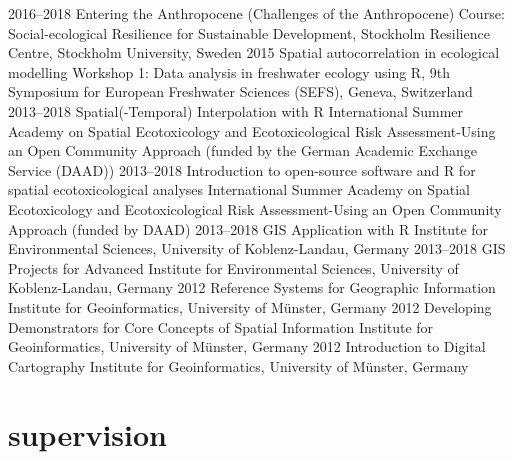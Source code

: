 \documentclass[]{friggeri-cv} %
\begin{document}
\begin{entrylist}
\entry
{\small{2016--2018}}
{Entering the Anthropocene (Challenges of the Anthropocene)}
{}
{Course: Social-ecological Resilience for Sustainable Development, Stockholm Resilience Centre, Stockholm University, Sweden}
\entry
{\small{2015}}
{Spatial autocorrelation in ecological modelling}
{}
{Workshop 1: Data analysis in freshwater ecology using R, 9th Symposium for European Freshwater Sciences (SEFS), Geneva, Switzerland}
\entry
{\small{2013--2018}}
{Spatial(-Temporal) Interpolation with R}
{}
{International Summer Academy on Spatial Ecotoxicology and Ecotoxicological Risk Assessment-Using an Open Community Approach (funded by the German Academic Exchange Service (DAAD))}
\entry
{\small{2013--2018}}
{Introduction to open-source software and R for spatial ecotoxicological analyses}
{}
{International Summer Academy on Spatial Ecotoxicology and Ecotoxicological Risk Assessment-Using an Open Community Approach (funded by DAAD)}
\entry
{\small{2013--2018}}
{GIS Application with R}
{}
{Institute for Environmental Sciences, University of Koblenz-Landau, Germany}
\entry
{\small{2013--2018}}
{GIS Projects for Advanced}
{}
{Institute for Environmental Sciences, University of Koblenz-Landau, Germany}
\entry
{\small{2012}}
{Reference Systems for Geographic Information}
{}
{Institute for Geoinformatics, University of M\"unster, Germany}
\entry
{\small{2012}}
{Developing Demonstrators for Core Concepts of Spatial Information}
{}
{Institute for Geoinformatics, University of M\"unster, Germany}
\entry
{\small{2012}}
{Introduction to Digital Cartography}
{}
{Institute for Geoinformatics, University of M\"unster, Germany}
\end{entrylist}


\section{supervision}
\end{document}
